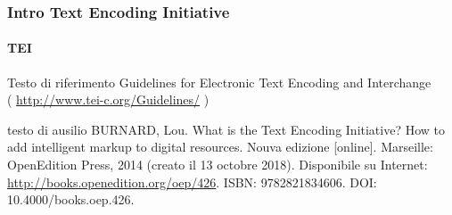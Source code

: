 \begin{frame}
	\frametitle{Intro Text Encoding Initiative}
	\framesubtitle{TEI}
	\addtocounter{nframe}{1}

	\begin{block}{Testo di riferimento}
        Guidelines for Electronic Text Encoding and Interchange 
        \\( \url{http://www.tei-c.org/Guidelines/} )
	\end{block}

	\begin{block}{testo di ausilio}
		BURNARD, Lou. What is the Text Encoding Initiative? How to add intelligent markup to digital resources. Nouva edizione [online]. Marseille: OpenEdition Press, 2014 (creato il 13 octobre 2018). Disponibile su Internet: \url{http://books.openedition.org/oep/426}. ISBN: 9782821834606. DOI: 10.4000/books.oep.426.

	\end{block}
\end{frame}







